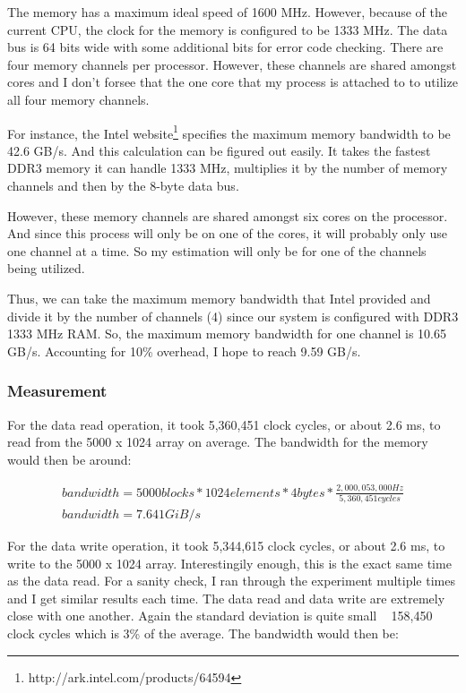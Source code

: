 \documentclass[paper=a4, fontsize=11pt]{scrartcl}
\numberwithin{equation}{section}        %
\numberwithin{figure}{section}          %
\numberwithin{table}{section}               %
\begin{document}
The memory has a maximum ideal speed of 1600 MHz.  However, because of the current CPU, the clock for the memory is configured to be 1333 MHz. The data bus is 64 bits wide with some additional bits for error code checking.  There are four memory channels per processor.  However, these channels are shared amongst cores and I don't forsee that the one core that my process is attached to to utilize all four memory channels.

For instance, the Intel website\footnote{http://ark.intel.com/products/64594} specifies the maximum memory bandwidth to be 42.6 GB/s.  And this calculation can be figured out easily.  It takes the fastest DDR3 memory it can handle 1333 MHz, multiplies it by the number of memory channels and then by the 8-byte data bus.

However, these memory channels are shared amongst six cores on the processor.  And since this process will only be on one of the cores, it will probably only use one channel at a time.  So my estimation will only be for one of the channels being utilized.

Thus, we can take the maximum memory bandwidth that Intel provided and divide it by the number of channels (4) since our system is configured with DDR3 1333 MHz RAM.  So, the maximum memory bandwidth for one channel is 10.65 GB/s.  Accounting for 10\% overhead, I hope to reach 9.59 GB/s.

\subsubsection{Measurement}

For the data read operation, it took 5,360,451 clock cycles, or about 2.6 ms, to read from the 5000 x 1024 array on average.  The bandwidth for the memory would then be around:

\begin{gather}
bandwidth = 5000 blocks * 1024 elements * 4 bytes * \frac{2,000,053,000 Hz}{5,360,451 cycles} \\
bandwidth = 7.641 GiB/s
\end{gather}

For the data write operation, it took 5,344,615 clock cycles, or about 2.6 ms, to write to the 5000 x 1024 array.  Interestingily enough, this is the exact same time as the data read.  For a sanity check, I ran through the experiment multiple times and I get similar results each time.  The data read and data write are extremely close with one another.  Again the standard deviation is quite small ~ 158,450 clock cycles which is 3\% of the average.  The bandwidth would then be:
\end{document}
